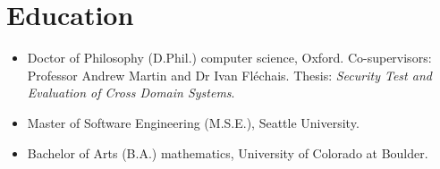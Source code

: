 \section*{Education}
\vspace{-2mm}

\begin{itemize}
    \item Doctor of Philosophy (D.Phil.) computer science, Oxford.
        Co-supervisors: Professor Andrew Martin and Dr Ivan Fl\'echais.
        Thesis: \emph{Security Test and Evaluation of Cross Domain Systems}.\vspace{-1mm}
	\item Master of Software Engineering (M.S.E.), Seattle University.\vspace{-1mm}
	\item Bachelor of Arts (B.A.) mathematics, University of Colorado at Boulder.
\end{itemize}

